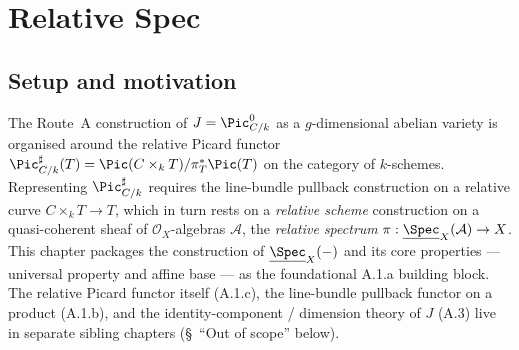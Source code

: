 \chapter{Relative Spec}
\label{chap:Picard_RelativeSpec}


\section{Setup and motivation}
\label{sec:relspec_setup}

The Route~A construction of \(J = \Pic^0_{C/k}\) as a \(g\)-dimensional abelian variety is
organised around the relative Picard functor
\(\Pic^\sharp_{C/k}(T) = \Pic(C \times_k T) / \pi_T^* \Pic(T)\)
on the category of \(k\)-schemes. Representing \(\Pic^\sharp_{C/k}\) requires the line-bundle
pullback construction on a relative curve \(C \times_k T \to T\), which in turn rests on a
\emph{relative scheme} construction on a quasi-coherent sheaf of \(\mathcal{O}_X\)-algebras
\(\mathcal{A}\), the \emph{relative spectrum}
\(\pi : \underline{\Spec}_X(\mathcal{A}) \to X\). This chapter packages the construction
of \(\underline{\Spec}_X(-)\) and its core properties --- universal property and affine
base --- as the foundational A.1.a building block. The relative Picard
functor itself (A.1.c), the line-bundle pullback functor on a product (A.1.b), and the
identity-component / dimension theory of \(J\) (A.3) live in separate sibling chapters
(\S~``Out of scope'' below).


